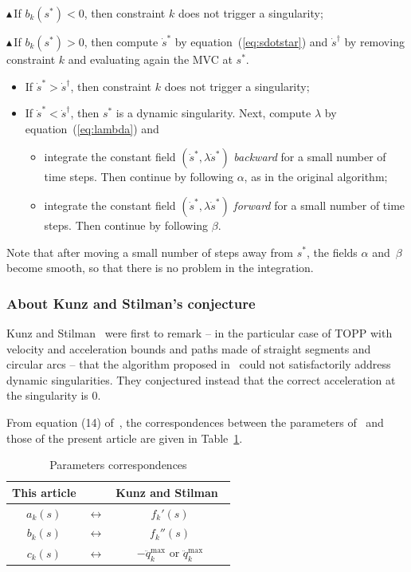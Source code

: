 \documentclass[9pt,technote]{IEEEtran}
\begin{document}
\noindent \textbf{$\blacktriangle$}\,If $b_k(s^*)<0$, then constraint
$k$ does not trigger a singularity;

\noindent \textbf{$\blacktriangle$}\,If $b_k(s^*)>0$, then compute $\dot{s}^*$ by
  equation~(\ref{eq:sdotstar}) and $\dot{s}^\dag$ by removing
  constraint $k$ and evaluating again the MVC at $s^*$.
  \begin{itemize}
  \item If $\dot{s}^*>\dot{s}^\dag$, then constraint $k$ does not
    trigger a singularity;
  \item If $\dot{s}^*<\dot{s}^\dag$, then $s^*$ is a dynamic
    singularity. Next, compute $\lambda$ by equation~(\ref{eq:lambda})
    and
    \begin{itemize}
    \item integrate the constant field $(\dot s^*,\lambda\dot s^*)$
      \emph{backward} for a small number of time steps. Then continue by
      following $\alpha$, as in the original algorithm;
    \item integrate the constant field $(\dot s^*,\lambda\dot s^*)$
      \emph{forward} for a small number of time steps. Then continue by
      following $\beta$.
    \end{itemize}
  \end{itemize}

Note that after moving a small number of steps away from $s^*$, the
fields $\alpha$ and~$\beta$ become smooth, so that there is no problem
in the integration.


\subsubsection{About Kunz and Stilman's conjecture}

Kunz and Stilman~\cite{KS12rss} were first to remark -- in the
particular case of TOPP with velocity and acceleration bounds and
paths made of straight segments and circular arcs -- that the
algorithm proposed in~\cite{SL92jdsmc} could not satisfactorily
address dynamic singularities. They conjectured instead that the
correct acceleration at the singularity is 0.

From equation (14) of~\cite{KS12rss}, the correspondences between the
parameters of~\cite{KS12rss} and those of the present article are
given in Table~\ref{tab:corresp}.

\begin{table}[th]
  \caption{Parameters correspondences}    
  \centering
    \begin{tabular}{|ccc|}
      \hline
      This article&&Kunz and Stilman~\cite{KS12rss}\\
      \hline      
      $a_k(s)$&$\leftrightarrow$&$f_k'(s)$\\
      $b_k(s)$&$\leftrightarrow$&$f_k''(s)$\\
      $c_k(s)$&$\leftrightarrow$&$-\ddot q_k^{\max}$ or $\ddot q_k^{\max}$\\
      \hline
     \end{tabular}
 \label{tab:corresp}  
\end{table}
\end{document}
